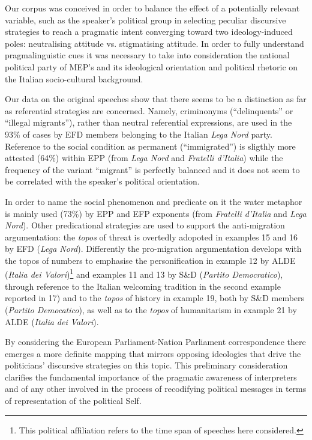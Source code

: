 \documentclass[output=paper]{langscibook}
\begin{document}
Our corpus was conceived in order to balance the effect of a potentially relevant variable, such as the speaker’s political group in selecting peculiar discursive strategies to reach a pragmatic intent converging toward two ideology-induced poles: neutralising attitude vs. stigmatising attitude. In order to fully understand pragmalinguistic cues it was necessary to take into consideration the national political party of MEP’s and its ideological orientation and political rhetoric on the Italian socio-cultural background.

Our data on the original speeches show that there seems to be a distinction as far as referential strategies are concerned. Namely, criminonyms (“delinquents” or “illegal migrants”), rather than neutral referential expressions, are used in the 93\% of cases by EFD members belonging to the Italian \textit{Lega Nord} party. Reference to the social condition as permanent (“immigrated”) is sligthly more attested (64\%) within EPP (from \textit{Lega Nord} and \textit{Fratelli d’Italia}) while the frequency of the variant “migrant” is perfectly balanced and it does not seem to be correlated with the speaker’s political orientation.

In order to name the social phenomenon and predicate on it the water metaphor is mainly used (73\%) by EPP and EFP exponents (from \textit{Fratelli d’Italia} and \textit{Lega Nord}). Other predicational strategies are used to support the anti-migration argumentation: the \textit{topos} of threat is overtedly adopoted in examples 15 and 16 by EFD (\textit{Lega Nord}). Differently the pro-migration argumentation develops with the topos of numbers to emphasise the personification in example 12 by ALDE (\textit{Italia dei Valori})\footnote{This political affiliation refers to the time span of speeches here considered.} and examples 11 and 13 by S\&D (\textit{Partito Democratico}), through reference to the Italian welcoming tradition in the second example reported in 17) and to the \textit{topos} of history in example 19, both by S\&D members (\textit{Partito Democatico}), as well as to the \textit{topos} of humanitarism in example 21 by ALDE (\textit{Italia dei Valori}).

By considering the European Parliament-Nation Parliament correspondence there emerges a more definite mapping that mirrors opposing ideologies that drive the politicians’ discursive strategies on this topic. This preliminary consideration clarifies the fundamental importance of the pragmatic awareness of interpreters and of any other involved in the process of recodifying political messages in terms of representation of the political Self.
\end{document}
